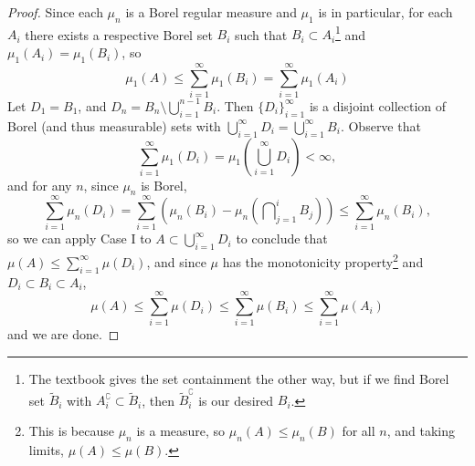 \documentclass[12pt,letterpaper]{article}
\begin{document}
\begin{enumerate}
\begin{proof}
Since each $\mu_n$ is a Borel regular measure and $\mu_1$ is in particular, for each $A_i$ there exists a respective Borel set $B_i$ such that $B_i\subset A_i$\footnote{The textbook gives the set containment the other way, but if we find Borel set $\tilde{B}_i$ with $A^\complement_i\subset\tilde{B}_i$, then $\tilde{B}_i^\complement$ is our desired $B_i$.} and $\mu_1(A_i)=\mu_1(B_i)$, so
$$\mu_1(A)\leq\sum_{i=1}^\infty\mu_1(B_i)=\sum_{i=1}^\infty\mu_1(A_i)$$
Let $D_1=B_1$, and $D_n=B_n\setminus\bigcup_{i=1}^{n-1} B_i$. Then $\{D_i\}_{i=1}^\infty$ is a disjoint collection of Borel (and thus measurable) sets with $\bigcup_{i=1}^\infty D_i = \bigcup_{i=1}^\infty B_i$. Observe that 
$$\sum_{i=1}^\infty \mu_1(D_i) = \mu_1 \left(\bigcup_{i=1}^\infty D_i\right)<\infty,$$
and for any $n$, since $\mu_n$ is Borel, 
$$\sum_{i=1}^\infty \mu_n(D_i) = \sum_{i=1}^\infty \left(\mu_n(B_i) - \mu_n\left(\bigcap\nolimits_{j=1}^i B_j\right)\right)\leq \sum_{i=1}^\infty \mu_n(B_i),$$
so we can apply Case I to $A\subset\bigcup_{i=1}^\infty  D_i$ to conclude that $\mu(A)\leq\sum_{i=1}^\infty \mu(D_i)$, and since $\mu$ has the monotonicity property\footnote{This is because $\mu_n$ is a measure, so $\mu_n(A)\leq\mu_n(B)$ for all $n$, and taking limits, $\mu(A)\leq\mu(B)$.} and $D_i\subset B_i \subset A_i$, 
$$\mu(A)\leq\sum_{i=1}^\infty \mu(D_i)\leq\sum_{i=1}^\infty \mu(B_i)\leq\sum_{i=1}^\infty \mu(A_i)$$
and we are done. 
\end{proof}


\end{enumerate}
\end{document}
